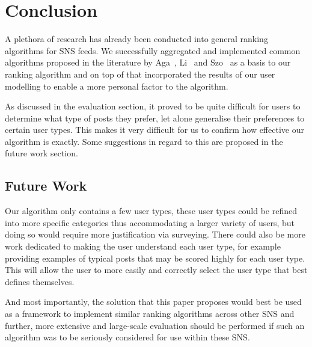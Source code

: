 \chapter{Conclusion}\label{ch:conclusion}

A plethora of research has already been conducted into general ranking algorithms for SNS feeds. We successfully aggregated and implemented common algorithms proposed in the literature by Aga~\cite{Aga2014}, Li~\cite{LiTiaLee2010} and Szo~\cite{szomszor2008semantic} as a basis to our ranking algorithm and on top of that incorporated the results of our user modelling to enable a more personal factor to the algorithm.

As discussed in the evaluation section, it proved to be quite difficult for users to determine what type of posts they prefer, let alone generalise their preferences to certain user types. This makes it very difficult for us to confirm how effective our algorithm is exactly. Some suggestions in regard to this are proposed in the future work section.

\section{Future Work}
 
Our algorithm only contains a few user types, these user types could be refined into more specific categories thus accommodating a larger variety of users, but doing so would require more justification via surveying. There could also be more work dedicated to making the user understand each user type, for example providing examples of typical posts that may be scored highly for each user type. This will allow the user to more easily and correctly select the user type that best defines themselves. 

And most importantly, the solution that this paper proposes would best be used as a framework to implement similar ranking algorithms across other SNS and further, more extensive and large-scale evaluation should be performed if such an algorithm was to be seriously considered for use within these SNS.
